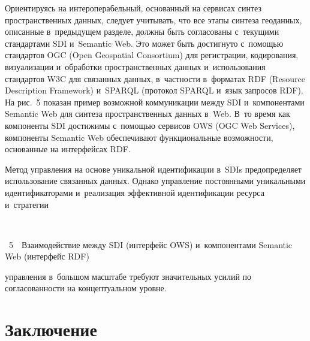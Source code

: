 \begin{multicols}{2}
     Ориентируясь на интероперабельный, основанный на сервисах синтез 
пространственных данных, следует учитывать, что все этапы синтеза 
геоданных, описанные в~предыдущем разделе, должны быть согласованы 
с~текущими стандартами SDI и~Semantic Web. Это может быть достигнуто 
с~по\-мощью стандартов OGC (Open Geospatial Consortium) 
для регистрации, кодирования, визуализации 
и~обработки пространственных данных и~использования стандартов W3C 
для 
связанных данных, в~част\-ности в~форматах RDF (Resource Description 
Framework) и~SPARQL (протокол SPARQL и~язык запросов RDF). На рис.~5 
показан пример возможной коммуникации между SDI и~компонентами Semantic 
Web для синтеза пространственных данных в~Web. В~то время как компоненты 
SDI достижимы с~помощью сервисов OWS (OGC Web Services), компоненты 
Semantic Web обеспечивают функциональные возможности, основанные на 
интерфейсах RDF.


  
      
     Метод управления на основе уникальной идентификации в~SDIs 
предопределяет использование связанных данных. Однако управление 
постоянными уникальными идентификаторами и~реализация эффективной 
идентификации ресурса и~стратегии\linebreak\vspace*{-12pt}

{ \begin{center}  %
 \vspace*{12pt}
   \mbox{%
 \epsfxsize=79mm 
 }


\end{center}


\noindent
{{\figurename~5}\ \ \small{Взаимодействие между SDI (интерфейс OWS) и~компонентами Semantic 
Web (интерфейс RDF)}}
}


\addtocounter{figure}{1}


\noindent
 управления в~большом масштабе требуют 
значительных усилий по согласованности на концептуальном уровне.
     
\section{Заключение}


\end{multicols}
